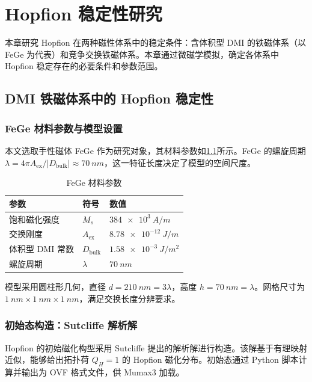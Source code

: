 \chapter{Hopfion 稳定性研究}

本章研究 Hopfion 在两种磁性体系中的稳定条件：含体积型 DMI 的铁磁体系（以 FeGe 为代表）和竞争交换铁磁体系。本章通过微磁学模拟，确定各体系中 Hopfion 稳定存在的必要条件和参数范围。


\section{DMI 铁磁体系中的 Hopfion 稳定性}

\subsection{FeGe 材料参数与模型设置}

本文选取手性磁体 FeGe 作为研究对象，其材料参数如\cref{tab:fege-params}所示。FeGe 的螺旋周期 $\lambda = 4\pi A_{\text{ex}} / |D_{\text{bulk}}| \approx \SI{70}{nm}$，这一特征长度决定了模型的空间尺度。

\begin{table}[htbp]
  \centering
  \caption{FeGe 材料参数}
  \label{tab:fege-params}
  \begin{tabular}{lll}
    \toprule
    参数 & 符号 & 数值 \\
    \midrule
    饱和磁化强度 & $M_s$ & $\SI{384e3}{A/m}$ \\
    交换刚度 & $A_{\text{ex}}$ & $\SI{8.78e-12}{J/m}$ \\
    体积型 DMI 常数 & $D_{\text{bulk}}$ & $\SI{1.58e-3}{J/m^2}$ \\
    螺旋周期 & $\lambda$ & $\SI{70}{nm}$ \\
    \bottomrule
  \end{tabular}
\end{table}

模型采用圆柱形几何，直径 $d = \SI{210}{nm} = 3\lambda$，高度 $h = \SI{70}{nm} = \lambda$。网格尺寸为 $\SI{1}{nm} \times \SI{1}{nm} \times \SI{1}{nm}$，满足交换长度分辨要求。

\subsection{初始态构造：Sutcliffe 解析解}

Hopfion 的初始磁化构型采用 Sutcliffe 提出的解析解\cite{sutcliffe2018hopfions}进行构造。该解基于有理映射近似，能够给出拓扑荷 $Q_H = 1$ 的 Hopfion 磁化分布。初始态通过 Python 脚本计算并输出为 OVF 格式文件，供 Mumax3 加载。

